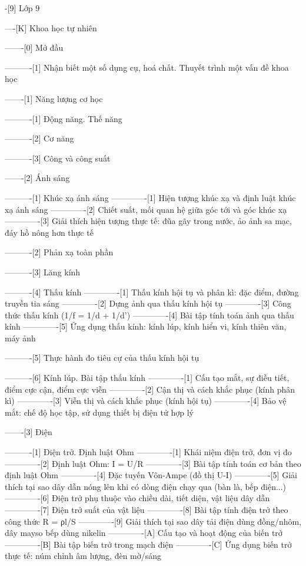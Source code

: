 -[9] Lớp 9

----[K] Khoa học tự nhiên

-------[0] Mở đầu

----------[1] Nhận biết một số dụng cụ, hoá chất. Thuyết trình một vấn đề khoa học

-------[1] Năng lượng cơ học

----------[1] Động năng. Thế năng

----------[2] Cơ năng

----------[3] Công và công suất

-------[2] Ánh sáng

----------[1] Khúc xạ ánh sáng
-------------[1] Hiện tượng khúc xạ và định luật khúc xạ ánh sáng
-------------[2] Chiết suất, mối quan hệ giữa góc tới và góc khúc xạ
-------------[3] Giải thích hiện tượng thực tế: đũa gãy trong nước, ảo ảnh sa mạc, đáy hồ nông hơn thực tế

----------[2] Phản xạ toàn phần

----------[3] Lăng kính

----------[4] Thấu kính
-------------[1] Thấu kính hội tụ và phân kì: đặc điểm, đường truyền tia sáng
-------------[2] Dựng ảnh qua thấu kính hội tụ
-------------[3] Công thức thấu kính (1/f = 1/d + 1/d')
-------------[4] Bài tập tính toán ảnh qua thấu kính
-------------[5] Ứng dụng thấu kính: kính lúp, kính hiển vi, kính thiên văn, máy ảnh

----------[5] Thực hành đo tiêu cự của thấu kính hội tụ

----------[6] Kính lúp. Bài tập thấu kính
-------------[1] Cấu tạo mắt, sự điều tiết, điểm cực cận, điểm cực viễn
-------------[2] Cận thị và cách khắc phục (kính phân kì)
-------------[3] Viễn thị và cách khắc phục (kính hội tụ)
-------------[4] Bảo vệ mắt: chế độ học tập, sử dụng thiết bị điện tử hợp lý

-------[3] Điện

----------[1] Điện trở. Định luật Ohm
-------------[1] Khái niệm điện trở, đơn vị đo
-------------[2] Định luật Ohm: I = U/R
-------------[3] Bài tập tính toán cơ bản theo định luật Ohm
-------------[4] Đặc tuyến Vôn-Ampe (đồ thị U-I)
-------------[5] Giải thích tại sao dây dẫn nóng lên khi có dòng điện chạy qua (bàn là, bếp điện...)
-------------[6] Điện trở phụ thuộc vào chiều dài, tiết diện, vật liệu dây dẫn
-------------[7] Điện trở suất của vật liệu
-------------[8] Bài tập tính điện trở theo công thức R = ρl/S
-------------[9] Giải thích tại sao dây tải điện dùng đồng/nhôm, dây mayso bếp dùng nikelin
-------------[A] Cấu tạo và hoạt động của biến trở
-------------[B] Bài tập biến trở trong mạch điện
-------------[C] Ứng dụng biến trở thực tế: núm chỉnh âm lượng, đèn mờ/sáng

